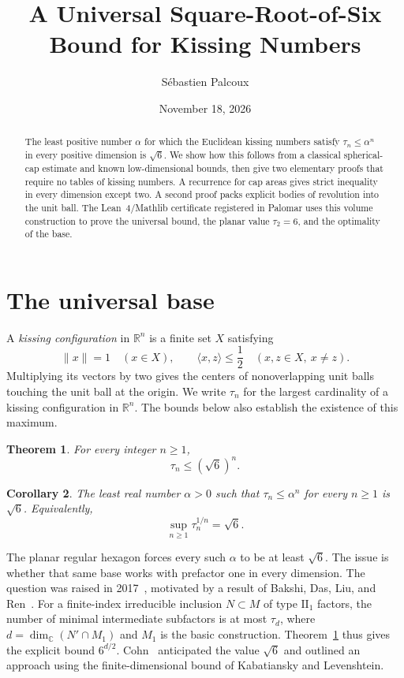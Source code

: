 \documentclass[11pt,a4paper]{article}
\title{A Universal Square-Root-of-Six Bound for Kissing Numbers}
\author{S\'ebastien Palcoux}
\date{November 18, 2026}
\newtheorem{theorem}{Theorem}
\newtheorem{corollary}[theorem]{Corollary}
\theoremstyle{remark}
\newcommand{\R}{\mathbb{R}}
\begin{document}
\maketitle

\begin{abstract}
The least positive number $\alpha$ for which the Euclidean kissing numbers satisfy
$\tau_n\leq\alpha^n$ in every positive dimension is $\sqrt6$. We show how this follows from a classical spherical-cap estimate and known low-dimensional bounds, then give two elementary proofs that require no tables of kissing numbers. A recurrence for cap areas gives strict inequality in every dimension except two. A second proof packs explicit bodies of revolution into the unit ball. The Lean~4/Mathlib certificate registered in Palomar uses this volume construction to prove the universal bound, the planar value $\tau_2=6$, and the optimality of the base.
\end{abstract}

\section{The universal base}

A \emph{kissing configuration} in $\R^n$ is a finite set $X$ satisfying
\begin{equation}\label{eq:configuration}
 \|x\|=1\quad(x\in X),\qquad
 \langle x,z\rangle\leq\frac12\quad(x,z\in X,\ x\ne z).
\end{equation}
Multiplying its vectors by two gives the centers of nonoverlapping unit balls touching the unit ball at the origin. We write $\tau_n$ for the largest cardinality of a kissing configuration in $\R^n$. The bounds below also establish the existence of this maximum.

\begin{theorem}\label{thm:main}
For every integer $n\geq1$,
\[
\tau_n\leq(\sqrt6)^n.
\]
\end{theorem}

\begin{corollary}\label{cor:base}
The least real number $\alpha>0$ such that $\tau_n\leq\alpha^n$ for every $n\geq1$ is $\sqrt6$. Equivalently,
\[
\sup_{n\geq1}\tau_n^{1/n}=\sqrt6.
\]
\end{corollary}

The planar regular hexagon forces every such $\alpha$ to be at least $\sqrt6$. The issue is whether that same base works with prefactor one in every dimension. The question was raised in 2017~\cite{MO-question}, motivated by a result of Bakshi, Das, Liu, and Ren~\cite[Theorem~4.1]{BDLR}. For a finite-index irreducible inclusion $N\subset M$ of type $\mathrm{II}_1$ factors, the number of minimal intermediate subfactors is at most $\tau_d$, where $d=\dim_{\mathbb C}(N'\cap M_1)$ and $M_1$ is the basic construction. Theorem~\ref{thm:main} thus gives the explicit bound $6^{d/2}$. Cohn~\cite{Cohn-answer} anticipated the value $\sqrt6$ and outlined an approach using the finite-dimensional bound of Kabatiansky and Levenshtein.
\end{document}
